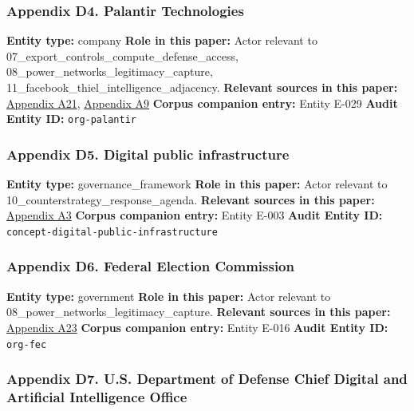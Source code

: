 \documentclass[
  american,
  11pt,
  letterpaper,
]{article}
\begin{document}
\subsubsection{Appendix D4. Palantir
Technologies}\label{appendix-d4-palantir-technologies}

\textbf{Entity type:} company \textbf{Role in this paper:} Actor
relevant to 07\_export\_controls\_compute\_defense\_access,
08\_power\_networks\_legitimacy\_capture,
11\_facebook\_thiel\_intelligence\_adjacency. \textbf{Relevant sources
in this paper:}
\hyperref[appendix-a21-anthropic-and-palantir-partner-to-bring-claude-ai-models-to-aws-for-u-s-government-intelligence-and-defense-operations]{Appendix
A21},
\hyperref[appendix-a9-army-launches-detachment-201-executive-innovation-corps-to-drive-tech-transformation]{Appendix
A9} \textbf{Corpus companion entry:} Entity E-029 \textbf{Audit Entity
ID:} \texttt{org-palantir}

\subsubsection{Appendix D5. Digital public
infrastructure}\label{appendix-d5-digital-public-infrastructure}

\textbf{Entity type:} governance\_framework \textbf{Role in this paper:}
Actor relevant to 10\_counterstrategy\_response\_agenda.
\textbf{Relevant sources in this paper:}
\hyperref[appendix-a3-interactions-between-artificial-intelligence-and-digital-public-infrastructure-concepts-benefits-and-challenges]{Appendix
A3} \textbf{Corpus companion entry:} Entity E-003 \textbf{Audit Entity
ID:} \texttt{concept-digital-public-infrastructure}

\subsubsection{Appendix D6. Federal Election
Commission}\label{appendix-d6-federal-election-commission}

\textbf{Entity type:} government \textbf{Role in this paper:} Actor
relevant to 08\_power\_networks\_legitimacy\_capture. \textbf{Relevant
sources in this paper:}
\hyperref[appendix-a23-leading-the-future-committee-overview]{Appendix
A23} \textbf{Corpus companion entry:} Entity E-016 \textbf{Audit Entity
ID:} \texttt{org-fec}

\subsubsection{Appendix D7. U.S. Department of Defense Chief Digital and
Artificial Intelligence
Office}\label{appendix-d7-u-s-department-of-defense-chief-digital-and-artificial-intelligence-office}
\end{document}
